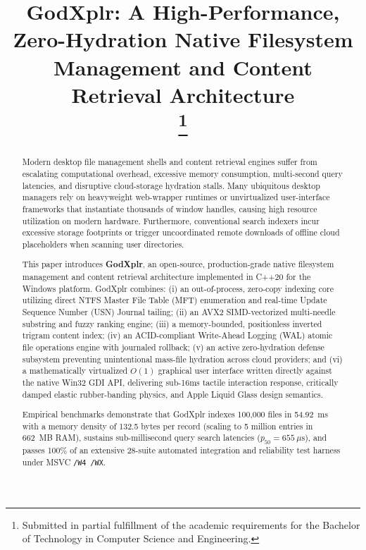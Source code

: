 \documentclass[conference]{IEEEtran}
\begin{document}
\title{GodXplr: A High-Performance, Zero-Hydration Native Filesystem Management and Content Retrieval Architecture\\
\thanks{Submitted in partial fulfillment of the academic requirements for the Bachelor of Technology in Computer Science and Engineering.}
}

\author{
}

\maketitle

\begin{abstract}
Modern desktop file management shells and content retrieval engines suffer from escalating computational overhead, excessive memory consumption, multi-second query latencies, and disruptive cloud-storage hydration stalls. Many ubiquitous desktop managers rely on heavyweight web-wrapper runtimes or unvirtualized user-interface frameworks that instantiate thousands of window handles, causing high resource utilization on modern hardware. Furthermore, conventional search indexers incur excessive storage footprints or trigger uncoordinated remote downloads of offline cloud placeholders when scanning user directories. 

This paper introduces \textbf{GodXplr}, an open-source, production-grade native filesystem management and content retrieval architecture implemented in C++20 for the Windows platform. GodXplr combines: (i) an out-of-process, zero-copy indexing core utilizing direct NTFS Master File Table (MFT) enumeration and real-time Update Sequence Number (USN) Journal tailing; (ii) an AVX2 SIMD-vectorized multi-needle substring and fuzzy ranking engine; (iii) a memory-bounded, positionless inverted trigram content index; (iv) an ACID-compliant Write-Ahead Logging (WAL) atomic file operations engine with journaled rollback; (v) an active zero-hydration defense subsystem preventing unintentional mass-file hydration across cloud providers; and (vi) a mathematically virtualized $O(1)$ graphical user interface written directly against the native Win32 GDI API, delivering sub-16ms tactile interaction response, critically damped elastic rubber-banding physics, and Apple Liquid Glass design semantics. 

Empirical benchmarks demonstrate that GodXplr indexes 100,000 files in 54.92~ms with a memory density of 132.5 bytes per record (scaling to 5 million entries in 662~MB RAM), sustains sub-millisecond query search latencies ($p_{50} = 655~\mu\text{s}$), and passes 100\% of an extensive 28-suite automated integration and reliability test harness under MSVC \texttt{/W4 /WX}.
\end{abstract}
\end{document}
